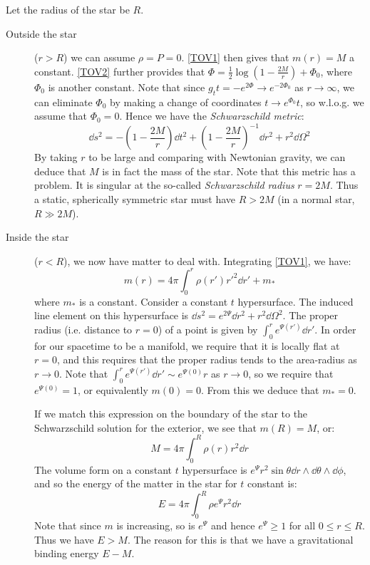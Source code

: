 \documentclass{jknotes}
\begin{document}
Let the radius of the star be \(R\).
\begin{description}
    \item[Outside the star] (\(r>R\)) we can assume \(\rho = P = 0\). \eqref{TOV1} then gives that \(m(r) = M\) a constant. \eqref{TOV2} further provides that \(\Phi = \frac{1}{2}\log\left( 1-\frac{2M}{r} \right) + \Phi_0\), where \(\Phi_0\) is another constant. Note that since \(g_tt = -e^{2\Phi} \rightarrow e^{-2\Phi_0}\) as \(r\rightarrow\infty\), we can eliminate \(\Phi_0\) by making a change of coordinates \(t\rightarrow e^{\Phi_0}t\), so w.l.o.g. we assume that \(\Phi_0 = 0\).
        Hence we have the \emph{Schwarzschild metric}:
        \begin{equation}
            \dd{s}^2 = - \left( 1 - \frac{2M}{r} \right)\dd{t}^2 + \left( 1 - \frac{2M}{r} \right)^{-1}\dd{r}^2 + r^2\dd{\Omega}^2
        \end{equation}
        By taking \(r\) to be large and comparing with Newtonian gravity, we can deduce that \(M\) is in fact the mass of the star.
        Note that this metric has a problem. It is singular at the so-called \emph{Schwarzschild radius} \(r=2M\). Thus a static, spherically symmetric star must have \(R>2M\) (in a normal star, \(R\gg2M\)).
    \item[Inside the star] (\(r<R\)), we now have matter to deal with. Integrating \eqref{TOV1}, we have:
        \begin{equation}
            m(r) = 4\pi\int_0^r\rho(r')r'^2\dd{r'}+m_*
        \end{equation}
        where \(m_*\) is a constant. Consider a constant \(t\) hypersurface. The induced line element on this hypersurface is \(\dd{s}^2 = e^{2\Psi}\dd{r}^2 + r^2\dd{\Omega}^2\). The proper radius (i.e. distance to \(r=0\)) of a point is given by \(\int_0^re^{\Psi(r')}\dd{r'}\). In order for our spacetime to be a manifold, we require that it is locally flat at \(r = 0\), and this requires that the proper radius tends to the area-radius as \(r\rightarrow 0\). Note that
        \(\int_0^re^{\Psi(r')}\dd{r'} \sim e^{\Psi(0)}r\) as \(r\rightarrow 0\), so we require that \(e^{\Psi(0)} = 1\), or equivalently \(m(0) = 0\). From this we deduce that \(m_*=0\). 

        If we match this expression on the boundary of the star to the Schwarzschild solution for the exterior, we see that \(m(R)=M\), or:
        \begin{equation}
            M = 4\pi\int_0^R\rho(r)r^2\dd{r}
            \tag{\(*\)}
            \label{match}
        \end{equation}
        The volume form on a constant \(t\) hypersurface is \(e^\Psi r^2\sin\theta \dd{r}\wedge\dd{\theta}\wedge\dd{\phi}\), and so the energy of the matter in the star for \(t\) constant is:
        \begin{equation}
            E = 4\pi\int_0^R\rho e^\Psi r^2\dd{r}
        \end{equation}
        Note that since \(m\) is increasing, so is \(e^\Psi\) and hence \(e^\Psi\ge1\) for all \(0 \le r \le R\). Thus we have \(E > M\). The reason for this is that we have a gravitational binding energy \(E-M\).


\end{description}
\end{document}
